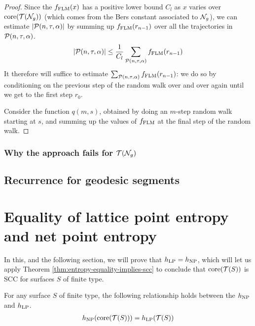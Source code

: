 \documentclass[12pt, reqno]{amsart}
\begin{document}
\begin{proof}
  Since the $f_{\mathrm{FLM}}(x)$ has a positive lower bound $C_l$ as $x$ varies over $\mathrm{core}(\mathcal{T}(\mathcal{N}_g))$ (which comes from the Bers constant associated to $\mathcal{N}_g$), we can estimate $\left| \mathcal{P}(n, \tau, \alpha) \right|$ by summing up $f_{\mathrm{FLM}}(r_{n-1})$ over all the trajectories in $\mathcal{P}(n, \tau, \alpha)$.
  \begin{align*}
   \left| \mathcal{P}(n, \tau, \alpha) \right| \leq \frac{1}{C_l} \sum_{\mathcal{P}(n, \tau, \alpha)} f_{\mathrm{FLM}}(r_{n-1})
  \end{align*}
  It therefore will suffice to estimate $\sum_{\mathcal{P}(n, \tau, \alpha)} f_{\mathrm{FLM}}(r_{n-1})$: we do so by conditioning on the previous step of the random walk over and over again until we get to the first step $r_0$.

  Consider the function $q(m, s)$, obtained by doing an $m$-step random walk starting at $s$, and summing up the values of $f_{\mathrm{FLM}}$ at the final step of the random walk.
\end{proof}

\subsubsection{Why the approach fails for $\mathcal{T}(\mathcal{N}_g)$}
\label{sec:why-approach-fails}



\subsection{Recurrence for geodesic segments}
\label{sec:recurr-geod-segm}



\section{Equality of lattice point entropy and net point entropy}
\label{sec:equal-latt-point}


In this, and the following section, we will prove that $h_{\mathrm{LP}} = h_{\mathrm{NP}}$, which will let us apply Theorem \ref{thm:entropy-equality-implies-scc} to conclude that $\mathrm{core}(\mathcal{T}(S))$ is SCC for surfaces $S$ of finite type.
\begin{theorem}
  \label{thm:entropy-equality}
  For any surface $S$ of finite type, the following relationship holds between the $h_{\mathrm{NP}}$ and $h_{\mathrm{LP}}$.
  \begin{align*}
    h_{\mathrm{NP}}(\mathrm{core}(\mathcal{T}(S))) = h_{\mathrm{LP}}(\mathcal{T}(S))
  \end{align*}
\end{theorem}
\end{document}
